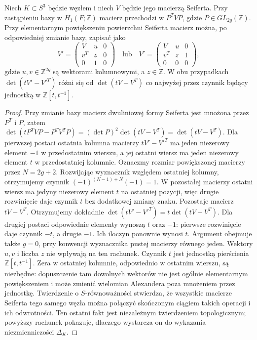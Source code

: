 \begin{stwierdzenie}
Niech $K\subset S^3$ będzie węzłem i niech $V$ będzie
jego macierzą Seiferta. Przy zastąpieniu bazy w
$H_1(F;\mathbb Z)$ macierz przechodzi w $P^TVP$,
gdzie $P\in GL_{2g}(\mathbb Z)$. Przy elementarnym
powiększeniu powierzchni Seiferta macierz można, po
odpowiedniej zmianie bazy, zapisać jako
\[
V'=\begin{pmatrix}V&u&0\\ v^T&z&0\\0&1&0\end{pmatrix}
\quad\text{lub}\quad
V'=\begin{pmatrix}V&u&0\\v^T&z&1\\0&0&0\end{pmatrix},
\]
gdzie $u,v\in\mathbb Z^{2g}$ są wektorami kolumnowymi,
a $z\in\mathbb Z$. W obu przypadkach
$\det(tV'-{V'}^T)$ różni się od $\det(tV-V^T)$
co najwyżej przez czynnik będący jednostką w
$\mathbb Z[t,t^{-1}]$.
\end{stwierdzenie}

\begin{proof}
Przy zmianie bazy macierz dwuliniowej formy Seiferta jest mnożona
przez $P^T$ i $P$, zatem
$\det(tP^TVP-P^TV^TP)=(\det P)^2\det(tV-V^T)
=\det(tV-V^T)$. Dla pierwszej postaci ostatnia kolumna macierzy
$tV'-{V'}^T$ ma jeden niezerowy element $-1$
w przedostatnim wierszu, a jej ostatni wiersz
ma jeden niezerowy element $t$ w przedostatniej
kolumnie. Oznaczmy rozmiar powiększonej macierzy przez $N=2g+2$.
Rozwijając wyznacznik względem ostatniej kolumny,
otrzymujemy czynnik $(-1)^{(N-1)+N}(-1)=1$.
W pozostałej macierzy ostatni wiersz ma jedyny
niezerowy element $t$ na ostatniej pozycji,
więc drugie rozwinięcie daje czynnik $t$ bez
dodatkowej zmiany znaku. Pozostaje macierz
$tV-V^T$. Otrzymujemy dokładnie
$\det(tV'-{V'}^T)=t\det(tV-V^T)$.
Dla drugiej postaci odpowiednie elementy
wynoszą $t$ oraz $-1$: pierwsze rozwinięcie
daje czynnik $-t$, a drugie $-1$.
Ich iloczyn ponownie wynosi $t$.
Argument obejmuje także $g=0$, przy konwencji
wyznacznika pustej macierzy równego jeden. Wektory $u,v$ i liczba $z$ nie wpływają
na ten rachunek. Czynnik $t$ jest jednostką
pierścienia $\mathbb Z[t,t^{-1}]$.
Zera w ostatniej kolumnie, odpowiednio
w ostatnim wierszu, są niezbędne: dopuszczenie
tam dowolnych wektorów nie jest ogólnie
elementarnym powiększeniem i może zmienić
wielomian Alexandera poza mnożeniem przez jednostkę.
Twierdzenie o $S$-równoważności stwierdza, że wszystkie macierze
Seiferta tego samego węzła można połączyć skończonym
ciągiem takich operacji i ich odwrotności. Ten ostatni
fakt jest niezależnym twierdzeniem topologicznym; powyższy
rachunek pokazuje, dlaczego wystarcza on do wykazania
niezmienniczości $\Delta_K$.
\end{proof}


